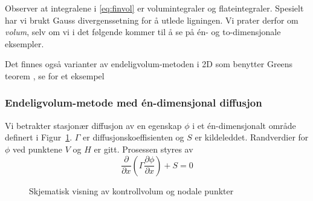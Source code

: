 \begin{rem}{}
Observer at integralene i \eqref{eq:finvol} er volumintegraler og flateintegraler. Spesielt har vi brukt Gauss divergenssetning  for å utlede ligningen. Vi prater derfor om \textit{volum}, selv om vi i det følgende kommer til å se på én- og to-dimensjonale eksempler.

Det finnes også varianter av endeligvolum-metoden i 2D som benytter Greens teorem , se \cite[Chapter 14.3]{LaT03} for et eksempel
\end{rem}

\subsubsection*{Endeligvolum-metode med én-dimensjonal diffusjon}

Vi betrakter stasjonær diffusjon av en egenskap $\phi$ i et én-dimensjonalt område definert i Figur~\ref{fig:cv-boundaries}. $\Gamma$ er diffusjonskoeffisienten og $S$ er kildeleddet. Randverdier for $\phi$ ved punktene $V$ og $H$ er gitt. Prosessen styres av
\begin{equation}
\frac{\partial}{\partial x} \left( \Gamma \frac{\partial\phi}{\partial x} \right) + S = 0
\end{equation}


\begin{figure}[ht]
\centering
{}
\caption{Skjematisk visning av kontrollvolum og nodale punkter}
\label{fig:cv-boundaries}
\end{figure}
